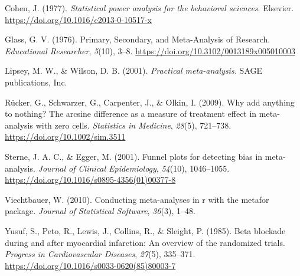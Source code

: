 \documentclass[
  11pt,
]{article}
\newlength{\cslhangindent}
\newlength{\cslentryspacingunit} %
\newenvironment{CSLReferences}[2] %
 {%
  \setlength{\parindent}{0pt}
  \ifodd #1
  \let\oldpar\par
  \def\par{\hangindent=\cslhangindent\oldpar}
  \fi
  \setlength{\parskip}{#2\cslentryspacingunit}
 }%
 {}
\begin{document}
\hypertarget{refs}{}
\begin{CSLReferences}{1}{0}
\leavevmode{}%
Cohen, J. (1977). \emph{Statistical power analysis for the behavioral sciences}. Elsevier. \url{https://doi.org/10.1016/c2013-0-10517-x}

\leavevmode{}%
Glass, G. V. (1976). Primary, Secondary, and Meta-Analysis of Research. \emph{Educational Researcher}, \emph{5}(10), 3--8. \url{https://doi.org/10.3102/0013189x005010003}

\leavevmode{}%
Lipsey, M. W., \& Wilson, D. B. (2001). \emph{Practical meta-analysis.} SAGE publications, Inc.

\leavevmode{}%
Rücker, G., Schwarzer, G., Carpenter, J., \& Olkin, I. (2009). Why add anything to nothing? The arcsine difference as a measure of treatment effect in meta-analysis with zero cells. \emph{Statistics in Medicine}, \emph{28}(5), 721--738. \url{https://doi.org/10.1002/sim.3511}

\leavevmode{}%
Sterne, J. A. C., \& Egger, M. (2001). Funnel plots for detecting bias in meta-analysis. \emph{Journal of Clinical Epidemiology}, \emph{54}(10), 1046--1055. \url{https://doi.org/10.1016/s0895-4356(01)00377-8}

\leavevmode{}%
Viechtbauer, W. (2010). Conducting meta-analyses in r with the metafor package. \emph{Journal of Statistical Software}, \emph{36}(3), 1--48.

\leavevmode{}%
Yusuf, S., Peto, R., Lewis, J., Collins, R., \& Sleight, P. (1985). Beta blockade during and after myocardial infarction: An overview of the randomized trials. \emph{Progress in Cardiovascular Diseases}, \emph{27}(5), 335--371. \url{https://doi.org/10.1016/s0033-0620(85)80003-7}

\end{CSLReferences}
\end{document}
